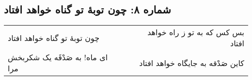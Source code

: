 \begin{center}
\section*{شماره ۸: چون توبۀ تو گناه خواهد افتاد}
\label{sec:008}
\begin{longtable}{l p{0.5cm} r}
چون توبهٔ تو گناه خواهد افتاد
&&
بس کس که به تو ز راه خواهد افتاد
\\
ای ماه! به صَدْقَه یک شکربخش مرا
&&
کاین صَدْقه به جایگاه خواهد افتاد
\\
\end{longtable}
\end{center}

